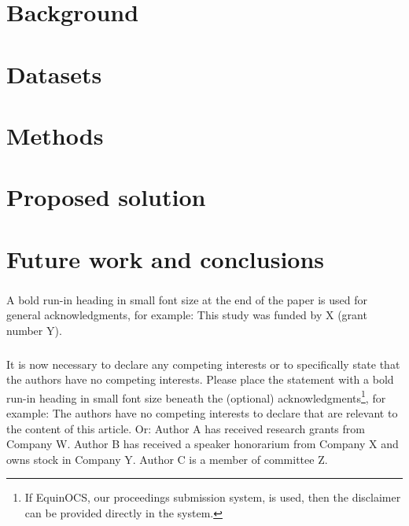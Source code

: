 \documentclass[runningheads]{llncs}
\begin{document}
\section{Background}
\label{sec:background}

\section{Datasets}
\label{sec:datasets}

\section{Methods}
\label{sec:methods}

\section{Proposed solution}
\label{sec:solution}


\section{Future work and conclusions}
\label{sec:conclusions}

\begin{credits}
\subsubsection{\ackname} A bold run-in heading in small font size at the end of the paper is
used for general acknowledgments, for example: This study was funded
by X (grant number Y).

\subsubsection{\discintname}
It is now necessary to declare any competing interests or to specifically
state that the authors have no competing interests. Please place the
statement with a bold run-in heading in small font size beneath the
(optional) acknowledgments\footnote{If EquinOCS, our proceedings submission
system, is used, then the disclaimer can be provided directly in the system.},
for example: The authors have no competing interests to declare that are
relevant to the content of this article. Or: Author A has received research
grants from Company W. Author B has received a speaker honorarium from
Company X and owns stock in Company Y. Author C is a member of committee Z.
\end{credits}
%
%
%


%
\end{document}
